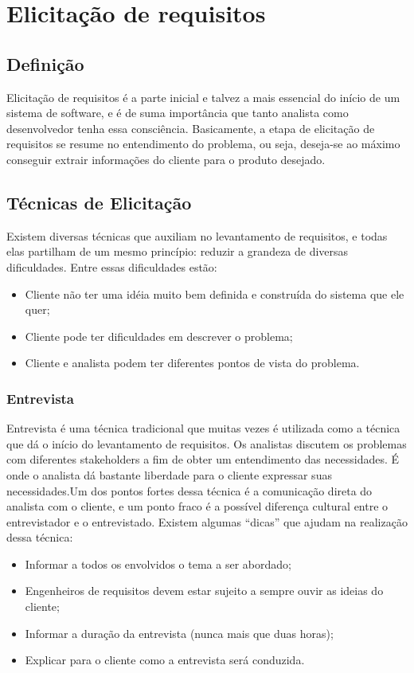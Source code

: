 \chapter{Elicitação de requisitos}

\section{Definição}
  Elicitação de requisitos é a parte inicial e talvez a mais essencial do início de um sistema de software, e é de suma importância que tanto analista como desenvolvedor tenha essa consciência. Basicamente, a etapa de elicitação de requisitos se resume no entendimento do problema, ou seja, deseja-se ao máximo conseguir extrair informações do cliente para o produto desejado.
 \section{Técnicas de Elicitação}
 Existem diversas técnicas que auxiliam no levantamento de requisitos, e todas elas partilham de um mesmo princípio: reduzir a grandeza de diversas dificuldades. Entre essas dificuldades estão:
\begin{itemize}
\item{Cliente não ter uma idéia muito bem definida e construída do sistema que ele quer;}
\item{Cliente pode ter dificuldades em descrever o problema;}
\item{Cliente e analista podem ter diferentes pontos de vista do problema.}
\end{itemize}
\subsection{Entrevista}
Entrevista é uma técnica tradicional que muitas vezes é utilizada como a técnica que dá o início do levantamento de requisitos. Os analistas discutem os problemas com diferentes stakeholders a fim de obter um entendimento das necessidades. É onde o analista dá bastante liberdade para o cliente expressar suas necessidades.Um dos pontos fortes dessa técnica é a comunicação direta do analista com o cliente, e um ponto fraco é a possível diferença cultural entre o entrevistador e o entrevistado. Existem algumas “dicas” que ajudam na realização dessa técnica:
\begin{itemize}
\item{Informar a todos os envolvidos o tema a ser abordado;}
\item{Engenheiros de requisitos devem estar sujeito a sempre ouvir as ideias do cliente;}
\item{Informar a duração da entrevista (nunca mais que duas horas);}
\item{Explicar para o cliente como a entrevista será conduzida.}
\end{itemize}
